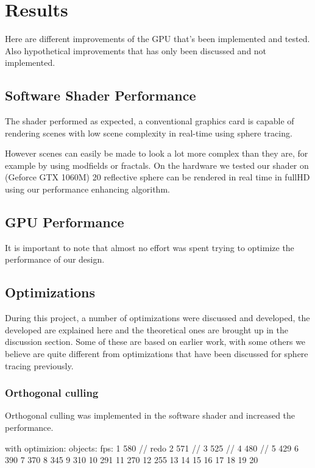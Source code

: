 \chapter{Results}

	Here are different improvements of the GPU that's been implemented and tested.
	Also hypothetical improvements that has only been discussed and not
	implemented.

	\section{Software Shader Performance}

		The shader performed as expected, a conventional graphics card is 
		capable of rendering scenes with low scene complexity in real-time
		using sphere tracing.

		However scenes can easily be made to look a lot more complex than they 
		are, for example by using modfields or fractals. On the hardware we 
		tested our shader on (Geforce GTX 1060M) 20 reflective sphere can
		be rendered in real time in fullHD using our performance enhancing 
		algorithm.


	\section{GPU Performance}
		
		It is important to note that almost no effort was spent trying to
		optimize the performance of our design.

	\section{Optimizations}
		
		During this project, a number of optimizations were discussed and 
		developed, the developed are explained here and the theoretical ones
		are brought up in the discussion section. Some of these are based on earlier
		work, with some others we believe are quite different from optimizations
		that have been discussed for sphere tracing previously.

		\subsection{Orthogonal culling}
			Orthogonal culling was implemented in the software shader and increased 
			the performance.


			with optimizion:
			objects:	fps:
			1			580	// redo
			2			571	//
			3			525	//
			4			480 //
			5			429
			6			390
			7			370
			8			345
			9			310
			10			291
			11			270
			12			255
			13			
			14
			15
			16
			17
			18
			19
			20



		
		
		

